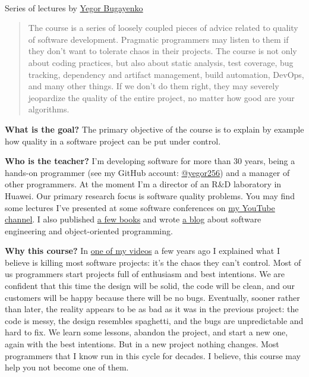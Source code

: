 \documentclass[nobrand,anonymous,nodate,nosecurity]{huawei}
\begin{document}
{\\
Series of lectures by \href{https://www.yegor256.com}{Yegor Bugayenko}


\begin{abstract}
The course is a series of loosely coupled pieces of advice related to quality of software development.
Pragmatic programmers may listen to them if they don't want
to tolerate chaos in their projects. The course is not only about
coding practices, but also about static analysis, test coverage,
bug tracking, dependency and artifact management, build automation,
DevOps, and many other things. If we don't do them right, they may
severely jeopardize the quality of the entire project, no matter
how good are your algorithms.
\end{abstract}


\textbf{What is the goal?}
The primary objective of the course is to explain by example how
quality in a software project can be put under control.

\textbf{Who is the teacher?}
I'm developing software for more than 30 years, being a hands-on programmer
(see my GitHub account: \href{https://github.com/yegor256}{@yegor256})
and a manager of other programmers. At the moment I'm a director
of an R\&D laboratory in Huawei. Our primary research focus is
software quality problems. You may find some lectures I've presented
at some software conferences on
\href{https://www.youtube.com/channel/UCr9qCdqXLm2SU0BIs6d_68Q}{my YouTube channel}.
I also published \href{https://www.yegor256.com/books.html}{a few books}
and wrote \href{https://www.yegor256.com/contents.html}{a blog} about software engineering
and object-oriented programming.

\textbf{Why this course?}
In \href{https://www.youtube.com/watch?v=kPmbRkSWYnY}{one of my videos}
a few years ago I explained what I believe is killing
most software projects: it's the chaos they can't control. Most of us
programmers start projects full of enthusiasm and best intentions.
We are confident that this time the design will be solid, the code will
be clean, and our customers will be happy because there will be no bugs.
Eventually, sooner rather than later, the reality appears to be as bad
as it was in the previous project: the code is messy, the design resembles
spaghetti, and the bugs are unpredictable and hard to fix. We learn some
lessons, abandon the project, and start a new one, again with the best
intentions. But in a new project nothing changes.
Most programmers that I know run in this cycle for decades.
I believe, this course may help you not become one of them.

}
\end{document}
